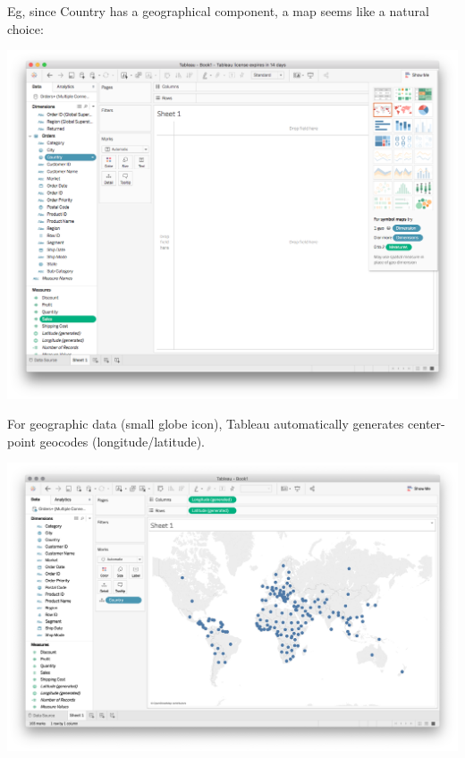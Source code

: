 \documentclass[xcolor=svgnames]{beamer} %
\begin{document}
\begin{frame}
Eg, since Country has a geographical component, a map seems like a natural choice:
\begin{center}
\includegraphics[width=.95\textwidth]{img/showme}
\end{center}
\end{frame}

\begin{frame}
For geographic data (small globe icon), Tableau automatically generates center-point geocodes (longitude/latitude).
\begin{center}
\includegraphics[width=.95\textwidth]{img/map}
\end{center}
\end{frame}


\end{document}
